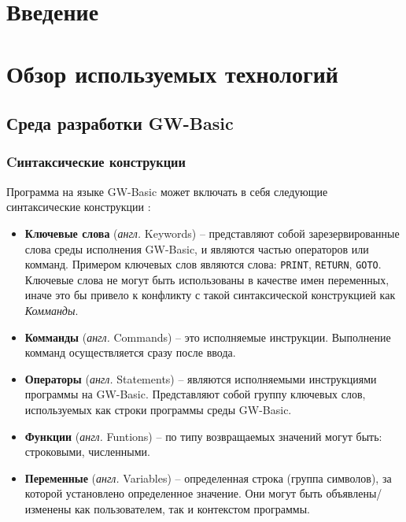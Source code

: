 \documentclass[12pt]{article}
\begin{document}
	\section{Введение}
	\newpage
	\section{Обзор используемых технологий}	
		\subsection{Среда разработки GW-Basic}
			
			
			\subsubsection{Cинтаксические конструкции}
			\hspace{\parindent} Программа на языке GW-Basic может включать в себя следующие синтаксические конструкции \cite{basicManual}:
			\begin{itemize}
				\item {\bf Ключевые слова} ({\it англ.} Keywords) -- представляют собой зарезервированные слова среды исполнения GW-Basic, и являются частью операторов или комманд. Примером ключевых слов являются слова: {\tt PRINT}, {\tt RETURN}, {\tt GOTO}. Ключевые слова не могут быть использованы в качестве имен переменных, иначе это бы привело к конфликту с такой синтаксической конструкцией как {\it Комманды}.
				\item {\bf Комманды} ({\it англ.} Commands) -- это исполняемые инструкции. Выполнение комманд осуществляется сразу после ввода.
				\item {\bf Операторы} ({\it англ.} Statements) -- являются исполняемыми инструкциями программы на GW-Basic. Представляют собой группу ключевых слов, используемых как строки программы среды GW-Basic.
				\item {\bf Функции} ({\it англ.} Funtions) -- по типу возвращаемых значений могут быть: строковыми, численными.
				\item {\bf Переменные} ({\it англ.} Variables) -- определенная строка (группа символов), за которой установлено определенное значение. Они могут быть объявлены/изменены как пользователем, так и контекстом программы.
			\end{itemize}
			
\end{document}
